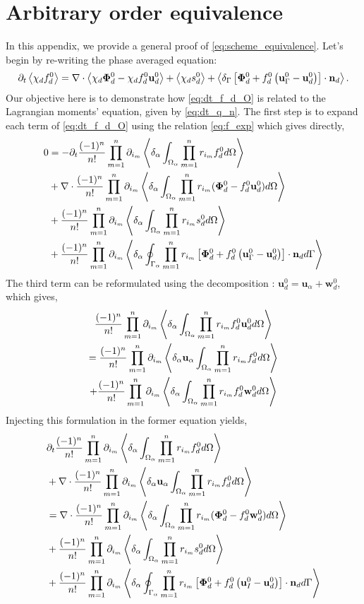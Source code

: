 \section{Arbitrary order equivalence}
\label{sec:demo}
In this appendix, we provide a general proof of \ref{eq:scheme_equivalence}. 
Let's begin by re-writing the phase averaged equation:
\begin{equation}
        \pddt \avg{\chi_d f_d^0}
        = \div \avg{\chi_d \bm\Phi_d^0 - \chi_d f_d^0 \textbf{u}_d^0}
        + \avg{\chi_d s_d^0}
        + \avg{\delta_\Gamma\left[
            \bm\Phi_d^0
            + f_d^0
            \left(
                \textbf{u}_\Gamma^0
                - \textbf{u}_d^0
            \right)
        \right]
        \cdot \textbf{n}_d}.
        \label{eq:dt_f_d_O}
\end{equation}
Our objective here is to demonstrate how \ref{eq:dt_f_d_O} is related to the Lagrangian moments' equation, given by \ref{eq:dt_q_n}. 
The first step is to expand each term of \ref{eq:dt_f_d_O} using the relation \ref{eq:f_exp} which gives directly,
\begin{align*}
        0 &=
        - \partial_t \frac{(-1)^n}{n!} \prod_{m=1}^{n} \partial_{i_m} \left<\delta_\alpha \int_{\Omega_{\alpha}}  \prod_{m=1}^{n} r_{i_m}f_d^0  d\Omega\right> \\
        &+\mathbf{\nabla}\cdot \frac{(-1)^n}{n!} \prod_{m=1}^{n} \partial_{i_m} \left<\delta_\alpha \int_{\Omega_{\alpha}}  \prod_{m=1}^{n} r_{i_m}(\bm\Phi_d^0  - f_d^0 \textbf{u}_d^0)  d\Omega\right>\\
        &+ \frac{(-1)^n}{n!} \prod_{m=1}^{n} \partial_{i_m} \left<\delta_\alpha \int_{\Omega_{\alpha}}  \prod_{m=1}^{n} r_{i_m} s_d^0  d\Omega\right>\\
        &+ \frac{(-1)^n}{n!} \prod_{m=1}^{n} \partial_{i_m} \left<\delta_\alpha \oint_{\Gamma_{\alpha}} \prod_{m=1}^{n} r_{i_m}\left[
            \bm\Phi_d^0
            + f_d^0
            \left(
                \textbf{u}_\Gamma^0
                - \textbf{u}_d^0
            \right)
        \right]
        \cdot \textbf{n}_d  d\Gamma\right> \\
\end{align*}
The third term can be reformulated using the decomposition : $\textbf{u}_d^0 = \textbf{u}_\alpha + \textbf{w}_d^0$, which gives,
\begin{multline}
    \frac{(-1)^n}{n!} \prod_{m=1}^{n} \partial_{i_m} \left<\delta_\alpha \int_{\Omega_{\alpha}}  \prod_{m=1}^{n} r_{i_m}f_d^0 \textbf{u}_d^0  d\Omega\right>\\
    =     \frac{(-1)^n}{n!} \prod_{m=1}^{n} \partial_{i_m} \left<\delta_\alpha \textbf{u}_\alpha\int_{\Omega_{\alpha}}  \prod_{m=1}^{n} r_{i_m}f_d^0   d\Omega\right>\\
    +     \frac{(-1)^n}{n!} \prod_{m=1}^{n} \partial_{i_m} \left<\delta_\alpha \int_{\Omega_{\alpha}}  \prod_{m=1}^{n} r_{i_m}f_d^0 \textbf{w}_d^0  d\Omega\right>
\end{multline}
Injecting this formulation in the former equation yields,
\begin{align}
    & \pddt \expo{f_d^0} \\
    &+ \div \expoU{f_d^0}\\
    &= \div \expo{(\bm\Phi_d^0 - f_d^0 \textbf{w}_d^0)}\\
    &+ \expo{ s_d^0}\\
    &+ \expoS{\left[
        \bm\Phi_d^0
        + f_d^0 
        \left(
            \textbf{u}_I^0
            - \textbf{u}_d^0
        \right)
    \right]
    \cdot \textbf{n}_d} \\
    \label{eq:nearly_done}
\end{align}
